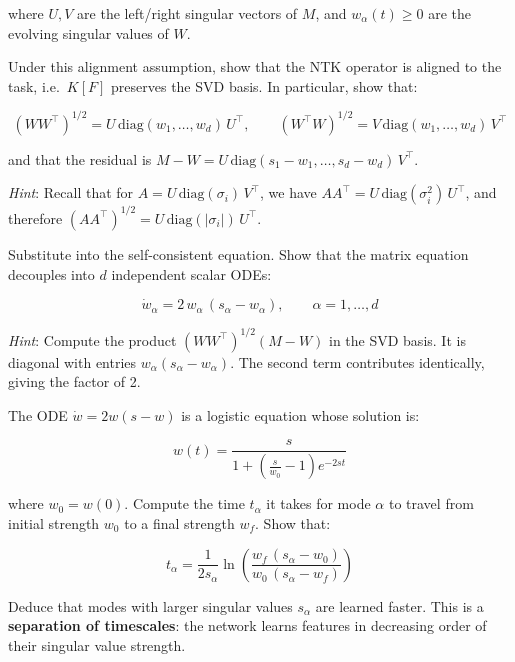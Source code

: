 \documentclass[11pt]{article}
\begin{document}
where \(U, V\) are the left/right singular vectors of \(M\), and
\(w_\alpha(t) \geq 0\) are the evolving singular values of \(W\).

\begin{exercise}
\label{ex:td-3ai}
Under this alignment assumption, show that the NTK
operator is aligned to the task, i.e.~\(K[F]\) preserves the SVD basis.
In particular, show that:

\[(WW^\top)^{1/2} = U\,\text{diag}(w_1, \ldots, w_d)\,U^\top, \qquad (W^\top W)^{1/2} = V\,\text{diag}(w_1, \ldots, w_d)\,V^\top\]

and that the residual is
\(M - W = U\,\text{diag}(s_1 - w_1, \ldots, s_d - w_d)\,V^\top\).

\emph{Hint}: Recall that for \(A = U\,\text{diag}(\sigma_i)\,V^\top\),
we have \(AA^\top = U\,\text{diag}(\sigma_i^2)\,U^\top\), and therefore
\((AA^\top)^{1/2} = U\,\text{diag}(|\sigma_i|)\,U^\top\).
\end{exercise}


\begin{exercise}
\label{ex:td-3aii}
Substitute into the self-consistent equation. Show that
the matrix equation decouples into \(d\) independent scalar ODEs:

\[\dot{w}_\alpha = 2\,w_\alpha\,(s_\alpha - w_\alpha), \qquad \alpha = 1, \ldots, d\]

\emph{Hint}: Compute the product \((WW^\top)^{1/2}(M - W)\) in the SVD
basis. It is diagonal with entries \(w_\alpha(s_\alpha - w_\alpha)\).
The second term contributes identically, giving the factor of 2.
\end{exercise}


\begin{exercise}
\label{ex:td-3b}
The ODE
\(\dot{w} = 2w(s - w)\) is a logistic equation whose solution is:

\[w(t) = \frac{s}{1 + \left(\frac{s}{w_0} - 1\right)e^{-2st}}\]

where \(w_0 = w(0)\). Compute the time \(t_\alpha\) it takes for mode
\(\alpha\) to travel from initial strength \(w_0\) to a final strength
\(w_f\). Show that:

\[t_\alpha = \frac{1}{2 s_\alpha} \ln\left(\frac{w_f\,(s_\alpha - w_0)}{w_0\,(s_\alpha - w_f)}\right)\]

Deduce that modes with larger singular values \(s_\alpha\) are learned
faster. This is a \textbf{separation of timescales}: the network learns
features in decreasing order of their singular value strength.
\end{exercise}
\end{document}
